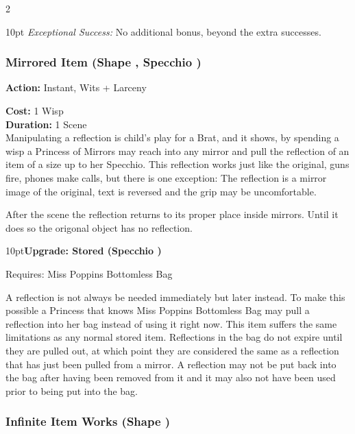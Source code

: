 \begin{multicols}{2}
\begin{myindentpar}{10pt}
    \emph{Exceptional Success:} No additional bonus, beyond the extra successes.\end{myindentpar}

\subsubsection*{Mirrored Item (Shape \textbullet, Specchio \textbullet)}

\noindent \textbf{Action:} Instant, Wits + Larceny

\noindent \textbf{Cost:} 1 Wisp \\

\noindent \textbf{Duration:} 1 Scene \\

Manipulating a reflection is child's play for a Brat, and it shows, by spending a wisp a Princess of Mirrors may reach into any mirror and pull the reflection of an item of a size up to her Specchio. This reflection works just like the original, guns fire, phones make calls, but there is one exception: The reflection is a mirror image of the original, text is reversed and the grip may be uncomfortable.

After the scene the reflection returns to its proper place inside mirrors. Until it does so the origonal object has no reflection.

\begin{myindentpar}{10pt}\textbf{Upgrade: Stored (Specchio \textbullet\textbullet)}

\noindent Requires: Miss Poppins Bottomless Bag

A reflection is not always be needed immediately but later instead. To make this possible a Princess that knows Miss Poppins Bottomless Bag may pull a reflection into her bag instead of using it right now. This item suffers the same limitations as any normal stored item. Reflections in the bag do not expire until they are pulled out, at which point they are considered the same as a reflection that has just been pulled from a mirror. A reflection may not be put back into the bag after having been removed from it and it may also not have been used prior to being put into the bag.\end{myindentpar}

\subsubsection*{Infinite Item Works (Shape \textbullet\textbullet)}


\end{multicols}
